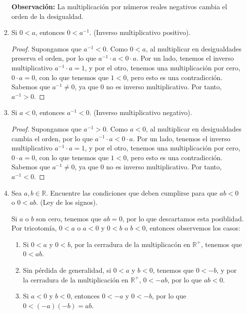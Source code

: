 \documentclass[11pt]{article}
\newcommand{\R}{\mathbb{R}}
\begin{document}
\begin{enumerate}[label=\alph*)]
    \textbf{Observación:} La multiplicación por números reales negativos cambia el orden de la desigualdad.

    \item Si $0<a$, entonces $0<a^{-1}$. (Inverso multiplicativo positivo).
    \vspace{-1em}\begin{proof} 
    Supongamos que $a^{-1}<0$. Como $0<a$, al multiplicar en desigualdades preserva el orden, por lo que $a^{-1} \cdot a<0 \cdot a$. Por un lado, tenemos el inverso multiplicativo $a^{-1} \cdot a = 1$, y por el otro, tenemos una multiplicación por cero, $0\cdot a=0$, con lo que tenemos que $1<0$, pero esto es una contradicción. Sabemos que $a^{-1}\neq 0$, ya que $0$ no es inverso multiplicativo. Por tanto, $a^{-1}>0$.
    \end{proof} \vspace{-1em}

    \item Si $a<0$, entonces $a^{-1}<0$. (Inverso multiplicativo negativo).
    \vspace{-1em}\begin{proof} 
        Supongamos que $a^{-1}>0$. Como $a<0$, al multiplicar en desigualdades cambia el orden, por lo que $a^{-1} \cdot a < 0 \cdot a$. Por un lado, tenemos el inverso multiplicativo $a^{-1}\cdot a =1$, y por el otro, tenemos una multiplicación por cero, $0\cdot a =0$, con lo que tenemos que $1<0$, pero esto es una contradicción. Sabemos que $a^{-1}\neq 0$, ya que $0$ no es inverso multiplicativo. Por tanto, $a^{-1}<0$.
    \end{proof} \vspace{-1em}

    \item Sea $a,b\in \R$. Encuentre las condiciones que deben cumplirse para que $ab<0$ o $0<ab$. (Ley de los signos).
    
    Si $a$ o $b$ son cero, tenemos que $ab=0$, por lo que descartamos esta posiblidad. Por tricotomía, $0<a$ o $a<0$ y $0<b$ o $b<0$, entonces observemos los casos:
    \begin{enumerate}[label=\roman*)]
        \item Si $0<a$ y $0<b$, por la cerradura de la multiplicacón en $\R^+$, tenemos que $0<ab$.
        \item Sin pérdida de generalidad, si $0<a$ y $b<0$, tenemos que $0<-b$, y por la cerradura de la multiplicación en $\R^+$, $0<-ab$, por lo que $ab<0$.
        \item Si $a<0$ y $b<0$, entonces $0<-a$ y $0<-b$, por lo que $0<(-a)(-b)=ab$.
    \end{enumerate}


\end{enumerate}
\end{document}
